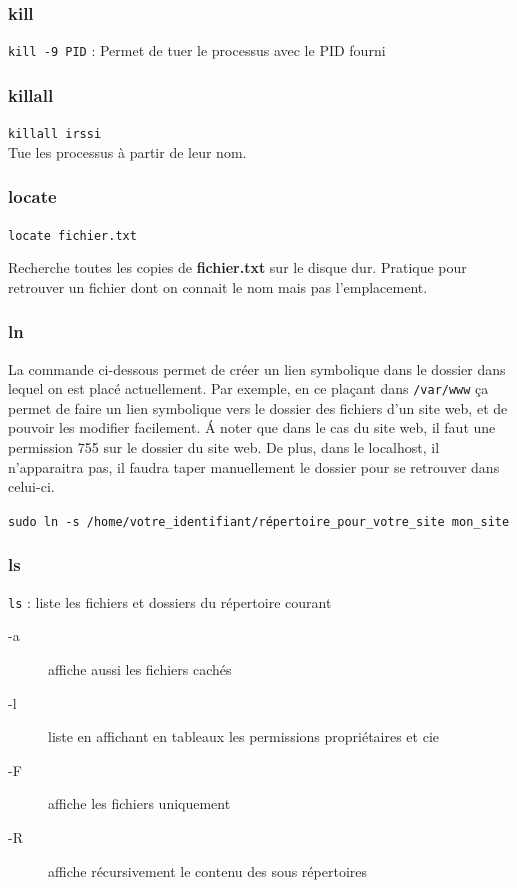 \documentclass[a4paper,twoside]{article}
\begin{document}
\subsubsection{kill}
\verb|kill -9 PID| : Permet de tuer le processus avec le PID fourni

\subsubsection{killall}
\verb|killall irssi|\\
Tue les processus à partir de leur nom.

\subsubsection{locate}
\verb|locate fichier.txt|

Recherche toutes les copies de \textbf{fichier.txt} sur le disque dur. Pratique pour retrouver un fichier dont on connait le nom mais pas l'emplacement.

\subsubsection{ln}
La commande ci-dessous permet de créer un lien symbolique dans le dossier dans lequel on est placé actuellement. Par exemple, en ce plaçant dans \verb|/var/www| ça permet de faire un lien symbolique vers le dossier des fichiers d'un site web, et de pouvoir les modifier facilement. \'A noter que dans le cas du site web, il faut une permission 755 sur le dossier du site web. De plus, dans le localhost, il n'apparaitra pas, il faudra taper manuellement le dossier pour se retrouver dans celui-ci.

\verb|sudo ln -s /home/votre_identifiant/répertoire_pour_votre_site mon_site|

\subsubsection{ls}
\verb|ls| : liste les fichiers et dossiers du répertoire courant
\begin{description}
 \item[-a] affiche aussi les fichiers cachés
\item[-l] liste en affichant en tableaux les permissions propriétaires et cie
\item[-F] affiche les fichiers uniquement
\item[-R] affiche récursivement le contenu des sous répertoires
\end{description}
\end{document}
